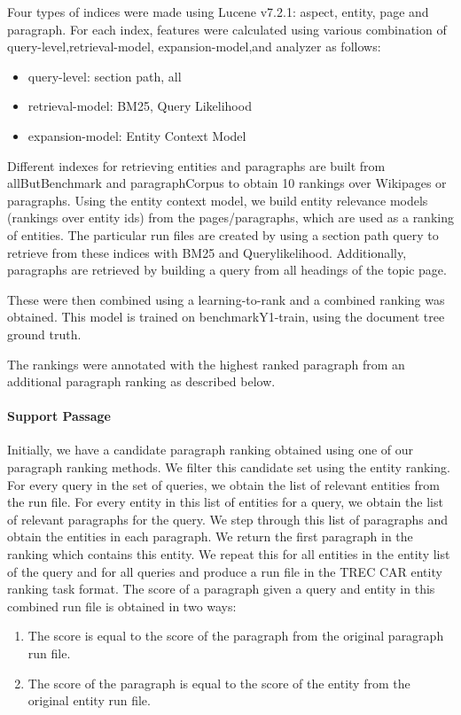\documentclass{article}
\begin{document}
Four types of indices were made using Lucene v7.2.1: aspect, entity, page and paragraph. For each index, features were calculated using various combination of query-level,retrieval-model, expansion-model,and analyzer as follows:
\begin{itemize}
   \item query-level: section path, all
    \item retrieval-model: BM25, Query Likelihood
    \item expansion-model: Entity Context Model
\end{itemize}
Different indexes for retrieving entities and paragraphs are built from allButBenchmark and paragraphCorpus to obtain 10 rankings over Wikipages or paragraphs. Using the entity context model, we build entity relevance models (rankings over entity ids) from the pages/paragraphs, which are used as a ranking of entities. The particular run files are created by using a section path query to retrieve from these indices with BM25 and Querylikelihood. Additionally, paragraphs are retrieved by building a query from all headings of the topic page.

These were then combined using a learning-to-rank and a combined ranking was obtained. 
This model is trained on benchmarkY1-train, using the document tree ground truth.



The rankings were annotated with the highest ranked paragraph from an additional paragraph ranking as described below.
\paragraph{Support Passage} Initially, we have a candidate paragraph ranking obtained using one of our paragraph ranking methods. We filter this candidate set using the entity ranking. For every query in the set of queries, we obtain the list of relevant entities from the run file. For every entity in this list of entities for a query, we obtain the list of relevant paragraphs for the query. We step through this list of paragraphs and obtain the entities in each paragraph. We return the first paragraph in the ranking which contains this entity. We  repeat this for all entities in the entity list of the query and for all queries and produce a run file in the TREC CAR entity ranking task format. The score of a paragraph given a query and entity in this combined run file is obtained in two ways:
\begin{enumerate}
\item The score is equal to the score of the paragraph from the original paragraph run file. 
\item The score of the paragraph is equal to the score of the entity from the original entity run file. 
\end{enumerate}
\end{document}
